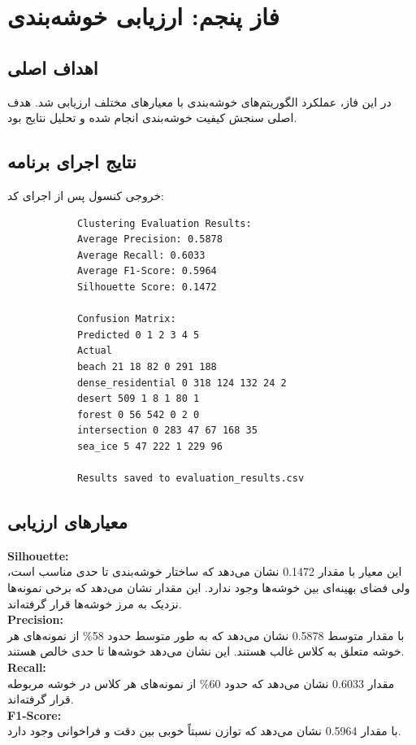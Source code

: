 \documentclass[a4paper,12pt]{article}
\let\nobreaksection\section
\renewcommand{\section}{\nobreaksection}  %
\begin{document}
	
	\section{فاز پنجم: ارزیابی خوشه‌بندی}
	
	\subsection*{\textbf{اهداف اصلی}}
	در این فاز، عملکرد الگوریتم‌های خوشه‌بندی با معیارهای مختلف ارزیابی شد. هدف اصلی سنجش کیفیت خوشه‌بندی انجام شده و تحلیل نتایج بود.
	\subsection*{\textbf{نتایج اجرای برنامه}}
	خروجی کنسول پس از اجرای کد:
	
	\begin{latin}
		\begin{verbatim}
			Clustering Evaluation Results:
			Average Precision: 0.5878
			Average Recall: 0.6033
			Average F1-Score: 0.5964
			Silhouette Score: 0.1472
			
			Confusion Matrix:
			Predicted 0 1 2 3 4 5
			Actual
			beach 21 18 82 0 291 188
			dense_residential 0 318 124 132 24 2
			desert 509 1 8 1 80 1
			forest 0 56 542 0 2 0
			intersection 0 283 47 67 168 35
			sea_ice 5 47 222 1 229 96
			
			Results saved to evaluation_results.csv
		\end{verbatim}
	\end{latin}
	\subsection*{\textbf{معیارهای ارزیابی}}
	
	\textbf{ Silhouette:}
	\\
	این معیار با مقدار 0.1472 نشان می‌دهد که ساختار خوشه‌بندی تا حدی مناسب است، ولی فضای بهینه‌ای بین خوشه‌ها وجود ندارد. این مقدار نشان می‌دهد که برخی نمونه‌ها نزدیک به مرز خوشه‌ها قرار گرفته‌اند.
	\\
	\textbf{ Precision:}
	\\
	با مقدار متوسط 0.5878 نشان می‌دهد که به طور متوسط حدود 58\% از نمونه‌های هر خوشه متعلق به کلاس غالب هستند. این نشان می‌دهد خوشه‌ها تا حدی خالص هستند.
	\\
	\textbf{Recall:}
	\\
	مقدار 0.6033 نشان می‌دهد که حدود 60\% از نمونه‌های هر کلاس در خوشه مربوطه قرار گرفته‌اند.
	\\
	\textbf{F1-Score:}
	\\
	با مقدار 0.5964 نشان می‌دهد که توازن نسبتاً خوبی بین دقت و فراخوانی وجود دارد.
	
\end{document}
